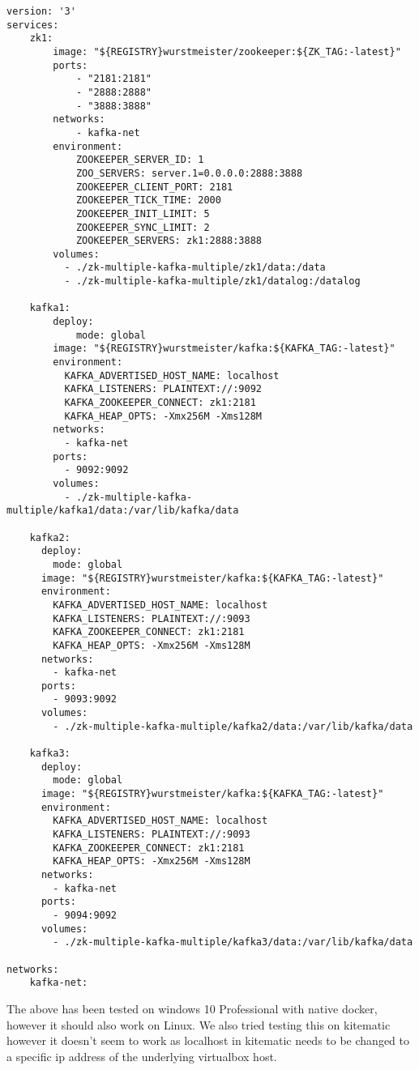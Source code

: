 \begin{verbatim}
version: '3'
services:
    zk1:
        image: "${REGISTRY}wurstmeister/zookeeper:${ZK_TAG:-latest}"
        ports:
            - "2181:2181"
            - "2888:2888"
            - "3888:3888"
        networks:
            - kafka-net
        environment:
            ZOOKEEPER_SERVER_ID: 1
            ZOO_SERVERS: server.1=0.0.0.0:2888:3888
            ZOOKEEPER_CLIENT_PORT: 2181
            ZOOKEEPER_TICK_TIME: 2000
            ZOOKEEPER_INIT_LIMIT: 5
            ZOOKEEPER_SYNC_LIMIT: 2
            ZOOKEEPER_SERVERS: zk1:2888:3888
        volumes:
          - ./zk-multiple-kafka-multiple/zk1/data:/data
          - ./zk-multiple-kafka-multiple/zk1/datalog:/datalog

    kafka1:
        deploy:
            mode: global
        image: "${REGISTRY}wurstmeister/kafka:${KAFKA_TAG:-latest}"
        environment:
          KAFKA_ADVERTISED_HOST_NAME: localhost
          KAFKA_LISTENERS: PLAINTEXT://:9092
          KAFKA_ZOOKEEPER_CONNECT: zk1:2181
          KAFKA_HEAP_OPTS: -Xmx256M -Xms128M
        networks:
          - kafka-net
        ports:
          - 9092:9092
        volumes:
          - ./zk-multiple-kafka-multiple/kafka1/data:/var/lib/kafka/data

    kafka2:
      deploy:
        mode: global
      image: "${REGISTRY}wurstmeister/kafka:${KAFKA_TAG:-latest}"
      environment:
        KAFKA_ADVERTISED_HOST_NAME: localhost
        KAFKA_LISTENERS: PLAINTEXT://:9093
        KAFKA_ZOOKEEPER_CONNECT: zk1:2181
        KAFKA_HEAP_OPTS: -Xmx256M -Xms128M
      networks:
        - kafka-net
      ports:
        - 9093:9092
      volumes:
        - ./zk-multiple-kafka-multiple/kafka2/data:/var/lib/kafka/data

    kafka3:
      deploy:
        mode: global
      image: "${REGISTRY}wurstmeister/kafka:${KAFKA_TAG:-latest}"
      environment:
        KAFKA_ADVERTISED_HOST_NAME: localhost
        KAFKA_LISTENERS: PLAINTEXT://:9093
        KAFKA_ZOOKEEPER_CONNECT: zk1:2181
        KAFKA_HEAP_OPTS: -Xmx256M -Xms128M
      networks:
        - kafka-net
      ports:
        - 9094:9092
      volumes:
        - ./zk-multiple-kafka-multiple/kafka3/data:/var/lib/kafka/data

networks:
    kafka-net:
\end{verbatim}

The above has been tested on windows 10 Professional with native docker, however it should also work on Linux. We also tried testing this on kitematic however it doesn't seem to work as localhost in kitematic needs to be changed to a specific ip address of the underlying virtualbox host.